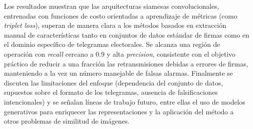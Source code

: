 Los resultados muestran que las arquitecturas siamesas convolucionales, entrenadas con funciones de costo orientadas a aprendizaje de métricas (como \textit{triplet loss}), superan de manera clara a los métodos basados en extracción manual de características tanto en conjuntos de datos estándar de firmas como en el dominio específico de telegramas electorales. Se alcanza una región de operación con \textit{recall} cercano a 0.9 y alta \textit{precision}, consistente con el objetivo práctico de reducir a una fracción las retransmisiones debidas a errores de firmas, manteniendo a la vez un número manejable de falsas alarmas. Finalmente se discuten las limitaciones del enfoque (dependencia del conjunto de datos, supuestos sobre el formato de los telegramas, ausencia de falsificaciones intencionales) y se señalan líneas de trabajo futuro, entre ellas el uso de modelos generativos para enriquecer las representaciones y la aplicación del método a otros problemas de similitud de imágenes.


